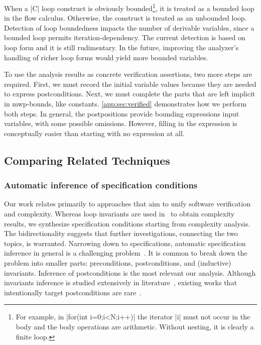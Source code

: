 When a \pr|C| loop construct is obviously bounded\footnote{For example, in \pr|for(int i=0;i<N;i++)| the iterator \pr|i| must not occur in the body and the body operations are arithmetic. Without nesting, it is clearly a finite loop.}, it is treated as a bounded loop in the flow calculus.
Otherwise, the construct is treated as an unbounded loop.
Detection of loop boundedness impacts the number of derivable variables, since a bounded loop permits iteration-dependency.
The current detection is based on loop form and it is still rudimentary.
In the future, improving the analyzer's handling of richer loop forms would yield more bounded variables.

To use the analysis results as concrete verification assertions, two more steps are required.
First, we must record the initial variable values because they are needed to express postconditions.
Next, we must complete the parts that are left implicit in mwp-bounds, like constants.
\autoref{app:sec:verified} demonstrates how we perform both steps.
In general, the postpositions provide bounding expressions \wrt input variables, with some possible omissions.
However, filling in the expression is conceptually easier than starting with no expression at all.

\subsection{Comparing Related Techniques}\label{sec:related-works}

\subsubsection{Automatic inference of specification conditions}
\label{subsec:automatic-inference}

Our work relates primarily to approaches that aim to unify software verification and complexity.
Whereas loop invariants are used in~\cite{nguyen2017} to obtain complexity results, we synthesize specification conditions starting from complexity analysis.
The bidirectionality suggests that further investigations, connecting the two topics, is warranted.
Narrowing down to specifications, automatic specification inference in general is a challenging problem~\cite{dillig2013,yu2023}.
It is common to break down the problem into smaller parts: preconditions, postconditions, and (inductive) invariants.
Inference of postconditions is the most relevant \wrt our analysis.
Although invariants inference is studied extensively in literature~\cite{karr1976,cousot1978,colon2003,sankaranarayanan2004,dillig2013,si2018,ryan2020,yao2020,yu2023,nguyen2014,nguyen2017},
existing works that intentionally target postconditions are rare~\cite{popeea2006,molina2021}.

